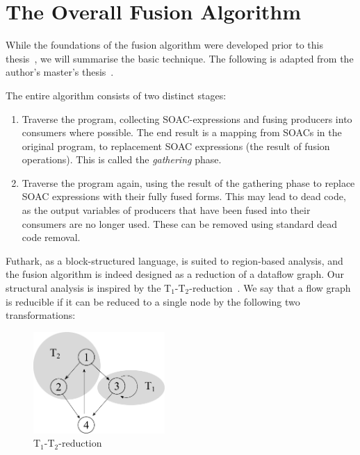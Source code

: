\section{The Overall Fusion Algorithm}
\label{sec:fusion-algorithm}

While the foundations of the fusion algorithm were developed prior to
this thesis~\cite{henriksen2013t2}, we will summarise the basic
technique.  The following is adapted from the author's master's
thesis~\cite{henriksen2014exploiting}.

The entire algorithm consists of two distinct stages:

\begin{enumerate}
\item Traverse the program, collecting SOAC-expressions and fusing
  producers into consumers where possible.  The end result is a
  mapping from SOACs in the original program, to replacement SOAC
  expressions (the result of fusion operations).  This is called the
  \textit{gathering} phase.

\item Traverse the program again, using the result of the gathering
  phase to replace SOAC expressions with their fully fused forms.
  This may lead to dead code, as the output variables of producers
  that have been fused into their consumers are no longer used.  These
  can be removed using standard dead code removal.
\end{enumerate}

Futhark, as a block-structured language, is suited to region-based
analysis, and the fusion algorithm is indeed designed as a reduction
of a dataflow graph.  Our structural analysis is inspired by the
T$_{1}$-T$_{2}$-reduction~\cite{red_dragon}.  We say that a flow graph
is reducible if it can be reduced to a single node by the following
two transformations:

\begin{figure}
\begin{center}
\includegraphics[width=5cm]{img/t1t2-1.pdf}
\end{center}
\caption{T$_{1}$-T$_{2}$-reduction}
\label{fig:t1t2-1}
\end{figure}

